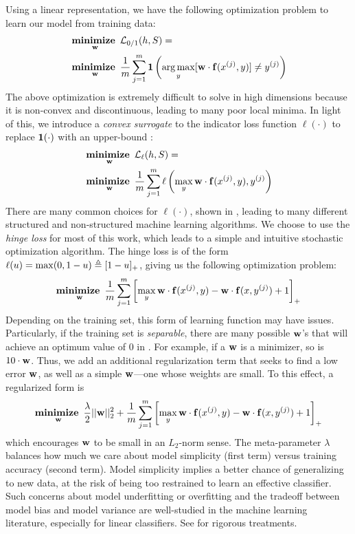Using a linear representation, we have the following optimization problem to learn our model from training data:
\begin{align}
&\mathop{\mathbf{minimize~}}_{\mathbf{w}} \mathcal{L}_{0/1}(h,S) = \\ &\mathop{\mathbf{minimize~}}_{\mathbf{w}} \frac{1}{m}\sum_{j=1}^m 
\mathbf{1}\left( \mathop{\arg\max}_y [\mathbf{w} \cdot \mathbf{f}(x^{(j)},y)] \neq y^{(j)}\right)
\end{align}
The above optimization is extremely difficult to solve in high dimensions 
because it is non-convex and discontinuous, leading to many poor local minima.  
In light of this, we introduce a {\em convex surrogate} to the indicator loss 
function $\ell(\cdot)$ to replace $\mathbf{1}(\cdot)$ with an upper-bound 
\citep{bishop-book}:
\begin{align}
&\mathop{\mathbf{minimize~}}_{\mathbf{w}} \mathcal{L}_{\ell}(h,S) = \\ &\mathop{\mathbf{minimize~}}_{\mathbf{w}} \frac{1}{m}\sum_{j=1}^m 
\ell\left( \max_y \mathbf{w} \cdot \mathbf{f}(x^{(j)},y), y^{(j)}\right)
\label{eq:convex-loss}
\end{align}
There are many common choices for $\ell(\cdot)$, shown in , 
leading to many different structured and non-structured machine learning 
algorithms.  We choose to use the {\em hinge loss} for most of this work, which 
leads to a simple and intuitive stochastic optimization algorithm.  The hinge 
loss is of the form $\ell(u) = \max (0,1-u) \triangleq [1-u]_+$, giving us the 
following optimization problem:
\begin{align}
\mathop{\mathbf{minimize~}}_{\mathbf{w}} \frac{1}{m}\sum_{j=1}^m \left[ \max_y \mathbf{w} \cdot \mathbf{f}(x^{(j)},y) - \mathbf{w} 
\cdot \mathbf{f}(x,y^{(j)}) + 1\right]_+
\label{eq:svm-noreg}
\end{align}
Depending on the training set, this form of learning function may have issues.  
Particularly, if the training set is {\em separable}, there are many possible 
$\mathbf{w}$'s that will achieve an optimum value of $0$ in . For 
example, if a $\mathbf{w}$ is a minimizer, so is $10\cdot \mathbf{w}$.  Thus, we add an 
additional regularization term that seeks to find a low error $\mathbf{w}$, as well as 
a simple $\mathbf{w}$---one whose weights are small. To this effect, a regularized form 
is
\begin{align}
\mathop{\mathbf{minimize~}}_{\mathbf{w}} \frac{\lambda}{2}||\mathbf{w}||_2^2 + \frac{1}{m}\sum_{j=1}^m \left[ 
\max_y \mathbf{w} \cdot \mathbf{f}(x^{(j)},y) - \mathbf{w} \cdot \mathbf{f}(x,y^{(j)}) + 1\right]_+
\label{eq:svm}
\end{align}
 which encourages $\mathbf{w}$ to be small in an $L_2$-norm sense.  The meta-parameter 
$\lambda$ balances how much we care about model simplicity (first term) versus 
training accuracy (second term).  Model simplicity implies a better chance of 
generalizing to new data, at the risk of being too restrained to learn an 
effective classifier.  Such concerns about model underfitting or overfitting 
and the tradeoff between model bias and model variance are well-studied in the 
machine learning literature, especially for linear classifiers. See 
\citet{bishop-book, esl-book} for rigorous treatments.


